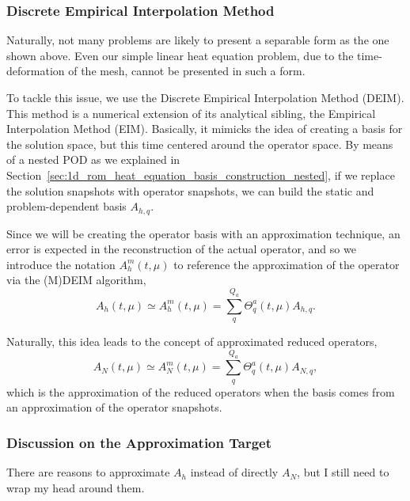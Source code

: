 \documentclass[../1_heat_equation.tex]{subfiles}
\begin{document}
\subsubsection{Discrete Empirical Interpolation Method}
Naturally, not many problems are likely to present a separable form as the one shown above.
Even our simple linear heat equation problem, due to the time-deformation of the mesh, cannot be presented in such a form. 

To tackle this issue, we use the Discrete Empirical Interpolation Method (DEIM).
This method is a numerical extension of its analytical sibling, the Empirical Interpolation Method (EIM).
Basically, it mimicks the idea of creating a basis for the solution space, but this time centered around the operator space.
By means of a nested POD as we explained in Section~\ref{sec:1d_rom_heat_equation_basis_construction_nested}, if we replace the solution snapshots with operator snapshots, we can build the static and problem-dependent basis $A_{h,q}$.

Since we will be creating the operator basis with an approximation technique, an error is expected in the reconstruction of the actual operator, and so we introduce the notation $A_h^m(t, \mu)$ to reference the approximation of the operator via the (M)DEIM algorithm,
\begin{equation}
    \label{eq:1d_rom_heat_equation_system_approximation}
    A_h(t, \mu) \simeq A_h^m(t, \mu) = \sum_q^{Q_a} \Theta_q^a(t, \mu) A_{h,q}.
\end{equation}

Naturally, this idea leads to the concept of approximated reduced operators,
\begin{equation}
    A_N(t, \mu) \simeq A_N^m(t, \mu) = \sum_q^{Q_a} \Theta_q^a(t, \mu) A_{N,q},
\end{equation}
which is the approximation of the reduced operators when the basis comes from an approximation of the operator snapshots. 

\subsubsection{Discussion on the Approximation Target}
There are reasons to approximate $A_h$ instead of directly $A_N$, but I still need to wrap my head around them. 
\end{document}
